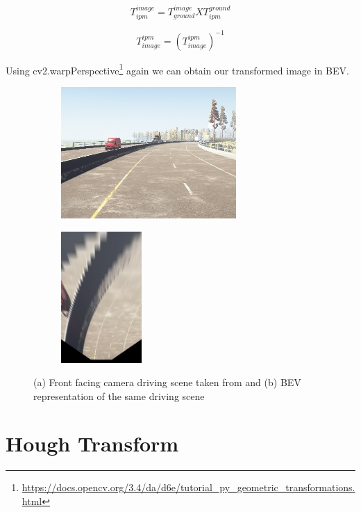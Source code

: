     \begin{equation}
    T^{image}_{ipm} = T^{image}_{ground} X T^{ground}_{ipm}
    \end{equation}
    
    \begin{equation}
    T^{ipm}_{image} = (T^{ipm}_{image})^{-1}
    \end{equation}
    
    Using cv2.warpPerspective\footnote{\url{https://docs.opencv.org/3.4/da/d6e/tutorial_py_geometric_transformations.html}} again we can obtain our transformed image in BEV. 
    
    
\begin{figure}[h]
\centering
\begin{subfigure}{0.6\textwidth}
\includegraphics[width=1\linewidth, height=5cm]{images/report_image.jpg} 
\caption{}
\label{fig:subim1}
\end{subfigure}
\begin{subfigure}{0.4\textwidth}
\includegraphics[width=0.5\linewidth, height=5cm]{images/report_image_ipm.jpg}
\caption{}
\label{fig:subim2}
\end{subfigure}

\caption{(a) Front facing camera driving scene taken from \cite{guo2020gen} and (b) BEV representation of the same driving scene}
\label{fig:image2}
\end{figure}
    
    \section{Hough Transform}
    
